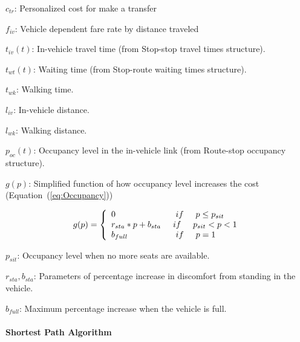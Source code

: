 $c_{tr}$: Personalized cost for make a transfer

$f_{iv}$: Vehicle dependent fare rate by distance traveled

$t_{iv}(t)$: In-vehicle travel time (from Stop-stop travel times structure).

$t_{wt}(t)$: Waiting time (from Stop-route waiting times structure).

$t_{wk}$: Walking time.

$l_{iv}$: In-vehicle distance.

$l_{wk}$: Walking distance.

$p_{oc}(t)$: Occupancy level in the in-vehicle link (from Route-stop occupancy structure).

$g(p)$: Simplified function of how occupancy level increases the cost (Equation~(\ref{eq:Occupancy}))

\begin{equation}\label{eq:Occupancy}
	g(p)=\left\{\begin{array}{l}
	0\hspace{25 mm}if\hspace{5 mm}p \leq p_{sit} \\
	r_{sta}*p + b_{sta}\hspace{5 mm} if\hspace{5 mm}p_{sit}<p<1\\
	b_{full}\hspace{20 mm} if\hspace{5 mm}p=1
	\end{array}\right.
\end{equation}

$p_{sit}$: Occupancy level when no more seats are available.

$r_{sta}, b_{sta}$: Parameters of percentage increase in discomfort from standing in the vehicle.

$b_{full}$: Maximum percentage increase when the vehicle is full.

\paragraph{Shortest Path Algorithm}


